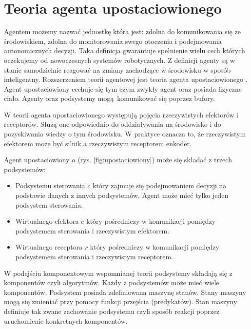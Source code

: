 \section{Teoria agenta upostaciowionego}
Agentem możemy nazwać jednostkę która jest: zdolna do komunikowania się ze środowiskiem, zdolna do monitorowania swego otoczenia i podejmowania autonomicznych decyzji. Taka definicja gwarantuje spełnienie wielu cech których oczekujemy od nowoczesnych systemów robotycznych. Z definicji agenty są w stanie samodzielnie reagować na zmiany zachodzące w środowisku w sposób inteligentny. Rozszerzeniem teorii agentowej jest teoria agenta upostaciowionego \cite{bib:agent1} \cite{bib:agent2}. Agent upostaciowiony cechuje się tym czym zwykły agent oraz posiada fizyczne ciało. Agenty oraz podsystemy mogą komunikować się poprzez bufory.


W teorii agenta upostaciowionego występują pojęcia rzeczywistych efektorów i receptorów. Służą one odpowiednio do oddziaływania na środowisko i do pozyskiwania wiedzy o tym środowisku. W praktyce oznacza to, że rzeczywistym efektorem może być silnik a rzeczywistym receptorem enkoder. 

Agent upostaciowiony $a$  (rys. \ref{fig:upostaciowiony}) może się składać z trzech podsystemów:
\begin{itemize}
	\item Podsystemu sterowania $c$ który zajmuje się podejmowaniem decyzji na podstawie danych z innych podsystemów. Agent może mieć tylko jeden podsystem sterowania.
	\item Wirtualnego efektora $e$ który pośredniczy w komunikacji pomiędzy podsystemem sterowania i rzeczywistym efektorem.
	\item Wirtualnego receptora $r$ który pośredniczy w komunikacji pomiędzy podsystemem sterowania i rzeczywistym receptorem.
\end{itemize}

W podejściu komponentowym wspomnianej teorii podsystemy składają się z komponentów czyli algorytmów. Każdy z podsystemów może mieć wiele komponentów. Podsystem posiada zdefiniowaną maszynę stanów. Stany maszyny mogą się zmieniać przy pomocy funkcji przejścia (predykatów). Stan maszyny definiuje tak zwane zachowanie podsystemu czyli sposób reakcji poprzez uruchomienie konkretnych komponentów. 

